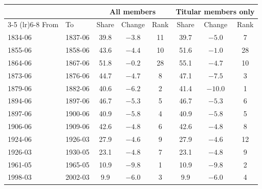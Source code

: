 \begin{tabular}{llcccccc}
\toprule
 & & \multicolumn{3}{c}{All members} & \multicolumn{3}{c}{Titular members only} \\
\cmidrule(lr){3-5} \cmidrule(lr){6-8}
From & To & Share & Change & Rank & Share & Change & Rank \\
\midrule
1834-06 & 1837-06 & 39.8 & $-3.8$ & 11 & 39.7 & $-5.0$ & 7 \\
1855-06 & 1858-06 & 43.6 & $-4.4$ & 10 & 51.6 & $-1.0$ & 28 \\
1864-06 & 1867-06 & 51.8 & $-0.2$ & 28 & 55.1 & $-4.7$ & 10 \\
1873-06 & 1876-06 & 44.7 & $-4.7$ & 8 & 47.1 & $-7.5$ & 3 \\
1879-06 & 1882-06 & 40.6 & $-6.2$ & 2 & 41.4 & $-10.0$ & 1 \\
1894-06 & 1897-06 & 46.7 & $-5.3$ & 5 & 46.7 & $-5.3$ & 6 \\
1897-06 & 1900-06 & 40.9 & $-5.8$ & 4 & 40.9 & $-5.8$ & 5 \\
1906-06 & 1909-06 & 42.6 & $-4.8$ & 6 & 42.6 & $-4.8$ & 8 \\
1924-06 & 1926-03 & 27.9 & $-4.6$ & 9 & 27.9 & $-4.6$ & 12 \\
1926-03 & 1930-05 & 23.1 & $-4.8$ & 7 & 23.1 & $-4.8$ & 9 \\
1961-05 & 1965-05 & 10.9 & $-9.8$ & 1 & 10.9 & $-9.8$ & 2 \\
1998-03 & 2002-03 & 9.9 & $-6.0$ & 3 & 9.9 & $-6.0$ & 4 \\
\bottomrule
\end{tabular}

